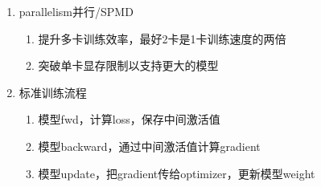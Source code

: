 \documentclass[UTF8,fontset=fandol]{ctexart}
\begin{document}
\begin{enumerate}
  \item parallelism并行/SPMD
  \begin{enumerate}
    \item 提升多卡训练效率，最好2卡是1卡训练速度的两倍
    \item 突破单卡显存限制以支持更大的模型
  \end{enumerate}

  \item 标准训练流程
  \begin{enumerate}
    \item 模型fwd，计算loss，保存中间激活值                 %
    \item 模型backward，通过中间激活值计算gradient          %
    \item 模型update，把gradient传给optimizer，更新模型weight %
  \end{enumerate}


\end{enumerate}
\end{document}
